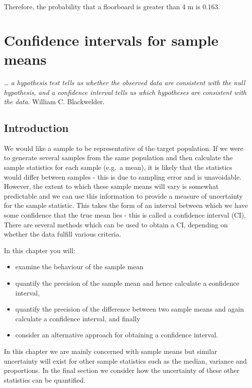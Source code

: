\documentclass[
  oneside]{krantz}
\providecommand{\tightlist}{%
  \setlength{\itemsep}{0pt}\setlength{\parskip}{0pt}}
\begin{document}
Therefore, the probability that a floorboard is greater than 4 m is 0.163.

\hypertarget{CIformean}{%
\chapter{Confidence intervals for sample means}\label{CIformean}}

\emph{\ldots{} a hypothesis test tells us whether the observed data are consistent with the null hypothesis, and a confidence interval tells us which hypotheses are consistent with the data.} William C. Blackwelder.

\hypertarget{INTci}{%
\section{Introduction}\label{INTci}}

We would like a sample to be representative of the target population. If we were to generate several samples from the same population and then calculate the sample statistics for each sample (e.g.~a mean), it is likely that the statistics would differ between samples - this is due to sampling error and is unavoidable. However, the extent to which these sample means will vary is somewhat predictable and we can use this information to provide a measure of uncertainty for the sample statistic. This takes the form of an interval between which we have some confidence that the true mean lies - this is called a confidence interval (CI). There are several methods which can be used to obtain a CI, depending on whether the data fulfill various criteria.

In this chapter you will:

\begin{itemize}
\tightlist
\item
  examine the behaviour of the sample mean
\item
  quantify the precision of the sample mean and hence calculate a confidence interval,
\item
  quantify the precision of the difference between two sample means and again calculate a confidence interval, and finally
\item
  consider an alternative approach for obtaining a confidence interval.
\end{itemize}

In this chapter we are mainly concerned with sample means but similar uncertainty will exist for other sample statistics such as the median, variance and proportions. In the final section we consider how the uncertainty of these other statistics can be quantified.
\end{document}
